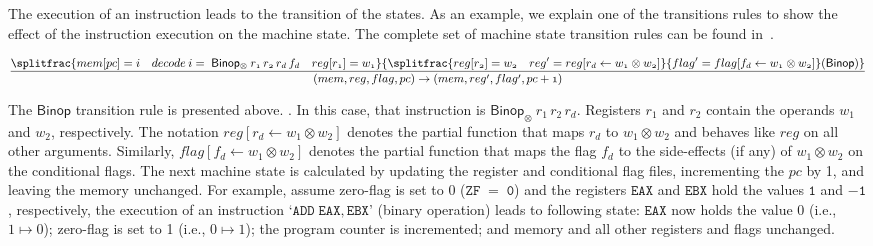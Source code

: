 The execution of an instruction leads to the transition of the states. As an example, we explain one of the transitions rules to show the effect of the instruction execution on the machine state. The complete set of machine state transition rules can be found in~\cite{de2015micro}.

\begin{equation*}
\small
\begin{aligned}
\mathnormal{\frac{ \splitfrac{mem[pc]=i \quad decode \: i = \; \mathsf{Binop_\otimes} \: r_1\, r_2\, r_d\,f_d \quad reg[r_1]=w_1}{\splitfrac{reg[r_2]=w_2 \quad reg^\prime = reg[r_d \leftarrow w_1 \otimes w_2]}{flag^\prime = flag[f_d \leftarrow w_1 \otimes w_2]\hfill}\hfill \mathsf{(Binop)}}}{(mem, reg, flag, pc) \rightarrow (mem, reg^\prime, flag^\prime, pc+1)}}
\end{aligned}
\end{equation*}

The $\mathsf{Binop}$ transition rule is presented above. . In this case, that instruction is $\mathsf{Binop_\otimes} \: r_1\, r_2\, r_d$. Registers $r_1$ and $r_2$ contain the operands $w_1$ and $w_2$, respectively. The notation $reg[r_d \leftarrow w_1 \otimes w_2]$ denotes the partial function that maps $r_d$ to $w_1 \otimes w_2$ and behaves like $reg$ on all other arguments. Similarly, $flag[f_d \leftarrow w_1 \otimes w_2]$ denotes the partial function that maps the flag $f_d$ to the side-effects (if any) of $w_1 \otimes w_2$ on the conditional flags. The next machine state is calculated by updating the register and conditional flag files, incrementing the $pc$ by 1, and leaving the memory unchanged. For example, assume zero-flag is set to 0 ($\mathtt{ZF\;=\;0}$) and the registers $\mathtt{EAX}$ and $\mathtt{EBX}$ hold the values $\mathtt{1}$ and $\mathtt{-1}$, respectively, the execution of an instruction `$\mathtt{ADD\;EAX, EBX}$' (binary operation) leads to following state: $\mathtt{EAX}$ now holds the value 0 (i.e., $1\mapsto0$); zero-flag is set to 1 (i.e., $0\mapsto1$); the program counter is incremented; and memory and all other registers and flags unchanged.



